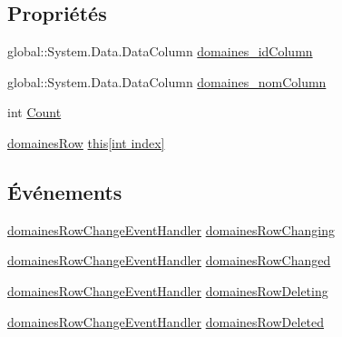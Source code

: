 \subsection*{Propriétés}
\begin{DoxyCompactItemize}
\item 
global\+::\+System.\+Data.\+Data\+Column \hyperlink{classforma_1_1formadb_data_set_1_1domaines_data_table_a7bce38da83c143a48e0355ce201aedb0}{domaines\+\_\+id\+Column}
\item 
global\+::\+System.\+Data.\+Data\+Column \hyperlink{classforma_1_1formadb_data_set_1_1domaines_data_table_adf99e30153e67d7d3c87fc8167ec0483}{domaines\+\_\+nom\+Column}
\item 
int \hyperlink{classforma_1_1formadb_data_set_1_1domaines_data_table_ab21b85e9029b4fc32437ed27cc6ca7b1}{Count}
\item 
\hyperlink{classforma_1_1formadb_data_set_1_1domaines_row}{domaines\+Row} \hyperlink{classforma_1_1formadb_data_set_1_1domaines_data_table_a41c37ac5178f444c35bc1ed36db3adec}{this\mbox{[}int index\mbox{]}}
\end{DoxyCompactItemize}
\subsection*{Événements}
\begin{DoxyCompactItemize}
\item 
\hyperlink{classforma_1_1formadb_data_set_a57fda2e5f9b16b843a20609c32ce5aa9}{domaines\+Row\+Change\+Event\+Handler} \hyperlink{classforma_1_1formadb_data_set_1_1domaines_data_table_aef2746d8dc2b7a06d9e2fa27e0747ce8}{domaines\+Row\+Changing}
\item 
\hyperlink{classforma_1_1formadb_data_set_a57fda2e5f9b16b843a20609c32ce5aa9}{domaines\+Row\+Change\+Event\+Handler} \hyperlink{classforma_1_1formadb_data_set_1_1domaines_data_table_ab6730fcb8af369a305cfccad5d99d7dc}{domaines\+Row\+Changed}
\item 
\hyperlink{classforma_1_1formadb_data_set_a57fda2e5f9b16b843a20609c32ce5aa9}{domaines\+Row\+Change\+Event\+Handler} \hyperlink{classforma_1_1formadb_data_set_1_1domaines_data_table_aca49466dd8d41e04cdd443987da632be}{domaines\+Row\+Deleting}
\item 
\hyperlink{classforma_1_1formadb_data_set_a57fda2e5f9b16b843a20609c32ce5aa9}{domaines\+Row\+Change\+Event\+Handler} \hyperlink{classforma_1_1formadb_data_set_1_1domaines_data_table_a3c4135e48f94fbb6ff59bcfd0c51271a}{domaines\+Row\+Deleted}
\end{DoxyCompactItemize}


